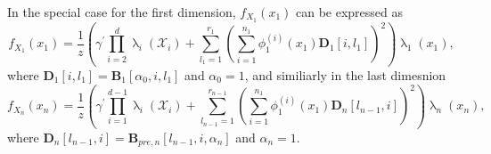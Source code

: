 In the special case for the first dimension, $f_{X_1}(x_1)$ can be expressed as
\begin{equation}
	f_{X_1}(x_1) = \frac{1}{z} \left(\gamma^{\prime} \prod_{i=2}^{d} \uplambda_i(\mathcal{X}_i) + \sum_{l_1=1}^{r_1} \left(\sum_{i=1}^{n_1} \phi^{(i)}_1(x_1) \bm{D}_1[i, l_1] \right)^2 \right) \uplambda_1(x_1),
\end{equation}
where $\bm{D}_1[i, l_1] = \bm{B}_1[\alpha_0, i, l_1]$ and $\alpha_0 = 1$,
and similiarly in the last dimesnion
\begin{equation}
	f_{X_n}(x_n) = \frac{1}{z} \left(\gamma^{\prime} \prod_{i=1}^{d-1} \uplambda_i(\mathcal{X}_i) + \sum_{l_{n-1}=1}^{r_{n-1}} \left(\sum_{i=1}^{n_1} \phi^{(i)}_1(x_1) \bm{D}_n[l_{n-1},i] \right)^2 \right) \uplambda_n(x_n),
\end{equation}
where $\bm{D}_n[l_{n-1},i] = \bm{B}_{pre,n}[l_{n-1}, i, \alpha_n]$ and $\alpha_n = 1$.
